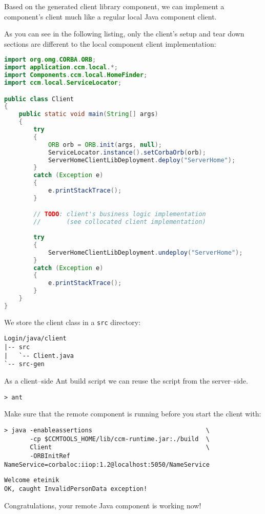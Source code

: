 Based on the generated client library component, we can implement a
component's client much like a regular local Java component client.

\vspace{3mm}
As you can see in the following listing, only the client's setup and tear down
sections are different to the local component client implementation:
\begin{footnotesize}
\begin{lstlisting}[language=Java]
import org.omg.CORBA.ORB;
import application.ccm.local.*;
import Components.ccm.local.HomeFinder;
import ccm.local.ServiceLocator;

public class Client
{
    public static void main(String[] args)
    {
        try
        {
            ORB orb = ORB.init(args, null);
            ServiceLocator.instance().setCorbaOrb(orb);
            ServerHomeClientLibDeployment.deploy("ServerHome");
        }
        catch (Exception e)
        {
            e.printStackTrace();
        }

        // TODO: client's business logic implementation 
        //       (see collocated client implementation)
        
        try
        {
            ServerHomeClientLibDeployment.undeploy("ServerHome");
        }
        catch (Exception e)
        {
            e.printStackTrace();
        }
    }
}
\end{lstlisting}
\end{footnotesize}

We store the client class in a {\tt src} directory:
\begin{footnotesize}
\begin{verbatim}
Login/java/client
|-- src
|   `-- Client.java
`-- src-gen
\end{verbatim}
\end{footnotesize}

As a client--side Ant build script we can reuse the script from the server--side.
\begin{footnotesize}
\begin{verbatim}
> ant
\end{verbatim}
\end{footnotesize}

Make sure that the remote component is running before you start the client with:
\begin{footnotesize}
\begin{verbatim}
> java -enableassertions                               \
       -cp $CCMTOOLS_HOME/lib/ccm-runtime.jar:./build  \
       Client                                          \
       -ORBInitRef NameService=corbaloc:iiop:1.2@localhost:5050/NameService
\end{verbatim}
\end{footnotesize}

\begin{footnotesize}
\begin{verbatim}
Welcome eteinik
OK, caught InvalidPersonData exception!
\end{verbatim}
\end{footnotesize}
Congratulations, your remote Java component is working now!

\newpage

